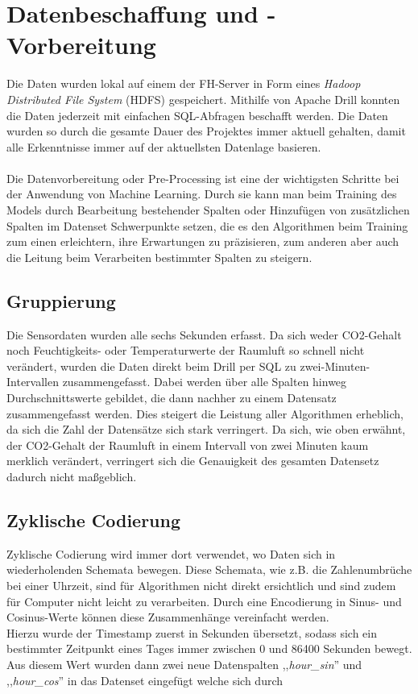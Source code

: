 \section{Datenbeschaffung und -Vorbereitung}
Die Daten wurden lokal auf einem der FH-Server in Form eines \textit{Hadoop Distributed File System} (HDFS) 
gespeichert. Mithilfe von Apache Drill konnten die Daten jederzeit mit einfachen SQL-Abfragen beschafft werden. 
Die Daten wurden so durch die gesamte Dauer des Projektes immer aktuell gehalten, damit alle Erkenntnisse 
immer auf der aktuellsten Datenlage basieren.
\\\\
Die Datenvorbereitung oder Pre-Processing ist eine der wichtigsten Schritte bei der Anwendung von Machine 
Learning. Durch sie kann man beim Training des Models durch Bearbeitung bestehender Spalten oder Hinzufügen 
von zusätzlichen Spalten im Datenset Schwerpunkte setzen, die es den Algorithmen beim Training zum einen 
erleichtern, ihre Erwartungen zu präzisieren, zum anderen aber auch die Leitung beim Verarbeiten bestimmter 
Spalten zu steigern.
\subsection{Gruppierung}
Die Sensordaten wurden alle sechs Sekunden erfasst. Da sich weder CO2-Gehalt noch Feuchtigkeits- oder 
Temperaturwerte der Raumluft so schnell nicht verändert, wurden die Daten direkt beim Drill per SQL zu 
zwei-Minuten-Intervallen zusammengefasst. Dabei werden über alle Spalten hinweg Durchschnittswerte gebildet, 
die dann nachher zu einem Datensatz zusammengefasst werden. 
Dies steigert die Leistung aller Algorithmen erheblich, da sich die Zahl der 
Datensätze sich stark verringert. Da sich, wie oben erwähnt, der CO2-Gehalt der Raumluft in einem 
Intervall von zwei Minuten kaum merklich verändert, verringert sich die Genauigkeit des gesamten Datensetz 
dadurch nicht maßgeblich.
\subsection{Zyklische Codierung}
Zyklische Codierung wird immer dort verwendet, wo Daten sich in wiederholenden Schemata bewegen. Diese 
Schemata, wie z.B. die Zahlenumbrüche bei einer Uhrzeit, sind für Algorithmen nicht direkt ersichtlich und 
sind zudem für Computer nicht leicht zu verarbeiten. Durch eine Encodierung in 
Sinus- und Cosinus-Werte können diese Zusammenhänge vereinfacht werden.\\
Hierzu wurde der Timestamp zuerst in Sekunden übersetzt, sodass sich ein bestimmter Zeitpunkt eines Tages 
immer zwischen 0 und 86400 Sekunden bewegt.
Aus diesem Wert wurden dann zwei neue Datenspalten ,,\textit{hour\_sin}'' und ,,\textit{hour\_cos}'' 
in das Datenset eingefügt welche sich durch 

